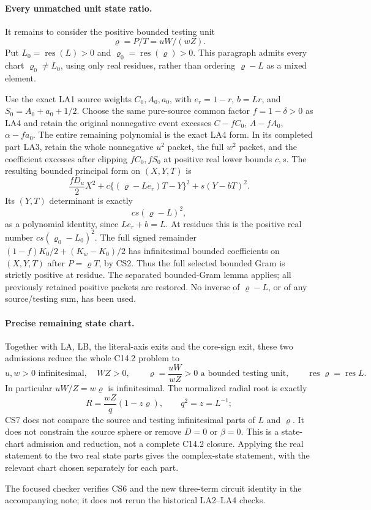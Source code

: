 \paragraph{Every unmatched unit state ratio.}
It remains to consider the positive bounded testing unit
\[
 \varrho=P/T=uW/(wZ).
\]
Put $L_0=\operatorname{res}(L)>0$ and
$\varrho_0=\operatorname{res}(\varrho)>0$.  This paragraph admits
every chart $\varrho_0\ne L_0$, using only real residues, rather
than ordering $\varrho-L$ as a mixed element.

Use the exact LA1 source weights $C_0,A_0,a_0$, with
$e_r=1-r$, $b=Lr$, and $S_0=A_0+a_0+1/2$.  Choose the same
pure-source common factor $f=1-\delta>0$ as LA4 and retain the
original nonnegative event excesses $C-fC_0$, $A-fA_0$,
$\alpha-fa_0$.  The entire remaining polynomial is the exact LA4
form.  In its completed part LA3, retain the whole nonnegative
$u^2$ packet, the full $w^2$ packet, and the coefficient excesses
after clipping $fC_0,fS_0$ at positive real lower bounds $c,s$.
The resulting bounded principal form on $(X,Y,T)$ is
\[
 \frac{fD_u}{2}X^2
   +c\{(\varrho-Le_r)T-Y\}^2+s(Y-bT)^2.         \tag{CS5}
\]
Its $(Y,T)$ determinant is exactly
\[
 cs(\varrho-L)^2,                               \tag{CS6}
\]
as a polynomial identity, since $Le_r+b=L$.  At residues this is
the positive real number $cs(\varrho_0-L_0)^2$.
The full signed remainder
$(1-f)K_0/2+(K_w-K_0)/2$ has infinitesimal bounded coefficients
on $(X,Y,T)$ after $P=\varrho T$, by CS2.  Thus the full selected
bounded Gram is strictly positive at residue.  The separated
bounded-Gram lemma applies; all previously retained positive
packets are restored.  No inverse of $\varrho-L$, or of any
source/testing sum, has been used.

\paragraph{Precise remaining state chart.}
Together with LA, LB, the literal-axis exits and the core-sign exit,
these two admissions reduce the whole C14.2 problem to
\[
 u,w>0\text{ infinitesimal},\quad WZ>0,\qquad
 \varrho=\frac{uW}{wZ}>0\text{ a bounded testing unit},\qquad
 \operatorname{res}\varrho=\operatorname{res}L.    \tag{CS7}
\]
In particular $uW/Z=w\varrho$ is infinitesimal.  The normalized
radial root is exactly
\[
 R=\frac{wZ}{q}(1-z\varrho),\qquad q^2=z=L^{-1};  \tag{CS8}
\]
CS7 does not compare the source and testing infinitesimal parts of
$L$ and $\varrho$.  It does not constrain the source sphere or
remove $D=0$ or $\beta=0$.  This is a state-chart admission and
reduction, not a complete C14.2 closure.  Applying the real statement
to the two real state parts gives the complex-state statement,
with the relevant chart chosen separately for each part.

The focused checker verifies CS6 and the new three-term circuit
identity in the accompanying note; it does not rerun the historical
LA2--LA4 checks.
